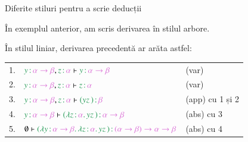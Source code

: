 \documentclass[xcolor=pdftex,romanian,colorlinks]{beamer}
\begin{document}
\begin{frame}{Diferite stiluri pentru a scrie deducții}

În exemplul anterior, am scris derivarea în \alert{stilul arbore}.

În \alert{stilul liniar}, derivarea precedentă ar arăta astfel:
\vspace{-.6cm}
\begin{center}
\begin{tabular}{rll}
1. & $\type{y}{\alpha \to \beta}, \type{z}{\alpha} \vdash \type{y}{\alpha\to \beta}$ & (var) \\
2. & $\type{y}{\alpha \to \beta}, \type{z}{\alpha} \vdash \type{z}{\alpha}$ & (var) \\
3. & $\type{y}{\alpha \to \beta}, \type{z}{\alpha} \vdash \type{(\app{yz})}{\beta}$ & (app) cu 1 și 2 \\
4. & $\type{y}{\alpha \to \beta} \vdash \type{(\abs{\type{z}{\alpha}}{\app{yz}})}{\alpha \to \beta}$ & (abs) cu 3 \\
5. & $\emptyset \vdash \type{(\abs{\type{y}{\alpha \to \beta}}{\abs{\type{z}{\alpha}}{\app{yz}}})}{(\alpha \to \beta)\to \alpha \to \beta}$ & (abs) cu 4 \\
\end{tabular}
\end{center}

\end{frame}
\end{document}
